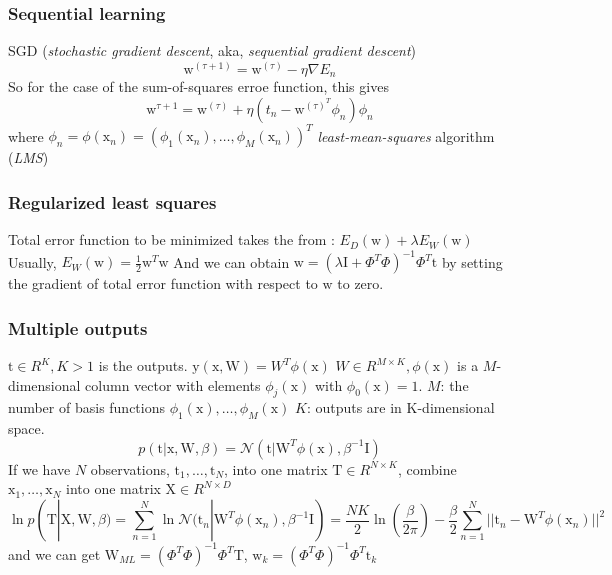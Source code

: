 \documentclass[a4paper]{book}
\begin{document}
\subsubsection{Sequential learning}
SGD (\emph{stochastic gradient descent}, aka, \emph{sequential gradient descent})\newline
$$\mathrm w^{(\tau+1)}=\mathrm w^{(\tau)}-\eta\nabla E_n$$
So for the case of the sum-of-squares erroe function, this gives
$$\mathrm w^{\tau+1}=\mathrm w^{(\tau)}+\eta(t_n-\mathrm w^{(\tau)^T}\phi_n)\phi_n$$ where $\phi_n=\phi(\mathrm x_n)=(\phi_1(\mathrm x_n), \dots, \phi_M(\mathrm x_n))^T$
\emph{least-mean-squares} algorithm (\emph{LMS})
\subsubsection{Regularized least squares}
Total error function to be minimized takes the from :
$E_D(\mathrm w) +\lambda E_W(\mathrm w)$ Usually, $E_W(\mathrm w) = \frac12\mathrm w^T\mathrm w$ And we can obtain $\mathrm w=(\lambda\mathrm I+\Phi^T\Phi)^{-1}\Phi^T\mathrm t$ by setting the gradient of total error function with respect to $\mathrm w$ to zero.
\subsubsection{Multiple outputs}
$\mathrm t\in R^K, K>1$ is the outputs.\newline
$\mathrm y(\mathrm x,\mathrm W) =W^T\phi(\mathrm x)$
$W\in R^{M\times K }, \phi(\mathrm x)$ is a $M$-dimensional column vector with elements $\phi_j(\mathrm x)$ with $\phi_0(\mathrm x) = 1$.\newline
$M$: the number of basis functions $\phi_1(\mathrm x), \dots, \phi_M(\mathrm x)$\newline
$K$: outputs are in K-dimensional space.
$$p(\mathrm t|\mathrm x,\mathrm W,\beta) = \mathcal N(\mathrm t|\mathrm W^T\phi(\mathrm x),\beta^{-1}\mathrm I)$$
If we have $N$ observations, $\mathrm t_1,\dots,\mathrm t_N$, into one matrix $\mathrm T\in R^{N\times K}$, combine $\mathrm x_1,\dots,\mathrm x_N$  into one  matrix $\mathrm X\in R^{N\times D}$
\begin{equation}\label{eq2.2.3}
  \ln p(\mathrm T|\mathrm X,\mathrm W,\beta) = \sum_{n=1}^N\ln\mathcal N(\mathrm t_n|\mathrm W^T\phi(\mathrm x_n), \beta^{-1}\mathrm I) = \frac{NK}{2}\ln(\frac{\beta}{2\pi})-\frac{\beta}{2}\sum_{n=1}^N||\mathrm t_n-\mathrm W^T\phi(\mathrm x_n)||^2
\end{equation}
and we can get $\mathrm W_{ML} = (\Phi^T\Phi)^{-1}\Phi^T\mathrm T$, $\mathrm w_k = (\Phi^T\Phi)^{-1}\Phi^T\mathrm t_k$
\end{document}
